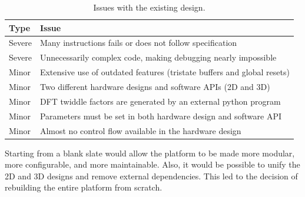 \begin{table}[!ht]
    \renewcommand{\arraystretch}{1.3}
    \centering
    \begin{tabular}{l|l}
        \bfseries Type & \bfseries Issue \\
        \hline
        Severe & Many instructions fails or does not follow specification \\
        Severe & Unnecessarily complex code, making debugging nearly impossible \\
        Minor & Extensive use of outdated features (tristate buffers and global resets) \\
        Minor & Two different hardware designs and software APIs (2D and 3D) \\
        Minor & DFT twiddle factors are generated by an external python program \\
        Minor & Parameters must be set in both hardware design and software API \\
        Minor & Almost no control flow available in the hardware design \\
    \end{tabular}
    \caption[Issues]{Issues with the existing design.}
    \label{tab:issues}
\end{table}

Starting from a blank slate would allow the platform to be made more modular, more configurable, and more maintainable.
Also, it would be possible to unify the 2D and 3D designs and remove external dependencies.
This led to the decision of rebuilding the entire platform from scratch.
